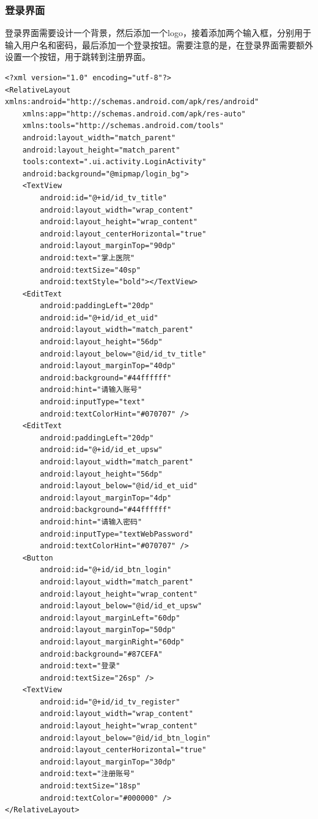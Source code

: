 \documentclass[UTF8,12pt]{article}
\begin{document}
\subsubsection{登录界面}
登录界面需要设计一个背景，然后添加一个logo，接着添加两个输入框，分别用于输入用户名和密码，最后添加一个登录按钮。需要注意的是，在登录界面需要额外设置一个按钮，用于跳转到注册界面。
\begin{lstlisting}
<?xml version="1.0" encoding="utf-8"?>
<RelativeLayout xmlns:android="http://schemas.android.com/apk/res/android"
    xmlns:app="http://schemas.android.com/apk/res-auto"
    xmlns:tools="http://schemas.android.com/tools"
    android:layout_width="match_parent"
    android:layout_height="match_parent"
    tools:context=".ui.activity.LoginActivity"
    android:background="@mipmap/login_bg">
    <TextView
        android:id="@+id/id_tv_title"
        android:layout_width="wrap_content"
        android:layout_height="wrap_content"
        android:layout_centerHorizontal="true"
        android:layout_marginTop="90dp"
        android:text="掌上医院"
        android:textSize="40sp"
        android:textStyle="bold"></TextView>
    <EditText
        android:paddingLeft="20dp"
        android:id="@+id/id_et_uid"
        android:layout_width="match_parent"
        android:layout_height="56dp"
        android:layout_below="@id/id_tv_title"
        android:layout_marginTop="40dp"
        android:background="#44ffffff"
        android:hint="请输入账号"
        android:inputType="text"
        android:textColorHint="#070707" />
    <EditText
        android:paddingLeft="20dp"
        android:id="@+id/id_et_upsw"
        android:layout_width="match_parent"
        android:layout_height="56dp"
        android:layout_below="@id/id_et_uid"
        android:layout_marginTop="4dp"
        android:background="#44ffffff"
        android:hint="请输入密码"
        android:inputType="textWebPassword"
        android:textColorHint="#070707" />
    <Button
        android:id="@+id/id_btn_login"
        android:layout_width="match_parent"
        android:layout_height="wrap_content"
        android:layout_below="@id/id_et_upsw"
        android:layout_marginLeft="60dp"
        android:layout_marginTop="50dp"
        android:layout_marginRight="60dp"
        android:background="#87CEFA"
        android:text="登录"
        android:textSize="26sp" />
    <TextView
        android:id="@+id/id_tv_register"
        android:layout_width="wrap_content"
        android:layout_height="wrap_content"
        android:layout_below="@id/id_btn_login"
        android:layout_centerHorizontal="true"
        android:layout_marginTop="30dp"
        android:text="注册账号"
        android:textSize="18sp"
        android:textColor="#000000" />
</RelativeLayout>
\end{lstlisting}
\end{document}
